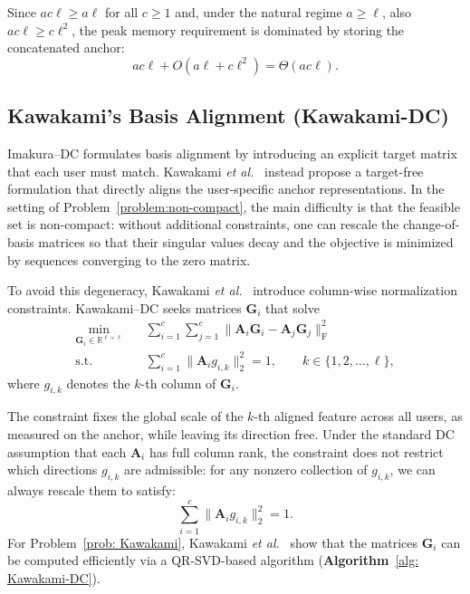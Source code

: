 \documentclass[final,3p,times]{elsarticle}
\theoremstyle{plain}
\newcommand{\matr}[1]{\bm{#1}}        %
\begin{document}
Since $a c \ell \ge a\ell$ for all $c \ge 1$ and, under the natural
regime $a \ge \ell$, also $a c \ell \ge c \ell^{2}$, the peak memory
requirement is dominated by storing the concatenated anchor:
\begin{equation}
  a c \ell + O(a\ell + c \ell^{2})
  = \Theta(a c \ell).
\end{equation}


\subsection{Kawakami's Basis Alignment (Kawakami-DC)}
\label{subsection: Kamakami}

Imakura--DC formulates basis alignment by introducing an explicit target matrix that each user must match. Kawakami \textit{et al.}~\cite{KawakamiDC} instead propose a target-free formulation that directly aligns the user-specific anchor representations. In the setting of Problem~\eqref{problem:non-compact}, the main difficulty is that the feasible set is non-compact: without additional constraints, one can rescale the change-of-basis matrices so that their singular values decay and the objective is minimized by sequences converging to the zero matrix.

To avoid this degeneracy, Kawakami \textit{et al.}~\cite{KawakamiDC} introduce column-wise normalization constraints. Kawakami--DC seeks matrices $\matr{G}_i$ that solve
\begin{equation}
    \label{prob: Kawakami}
    \begin{aligned}
        \min_{\matr{G}_{i}\in \mathbb{R}^{\ell \times \ell}}\quad
        & \sum_{i=1}^{c}\sum_{j=1}^{c}
        \bigl\|
            \matr{A}_{i}\matr{G}_{i}-\matr{A}_{j}\matr{G}_{j}
        \bigr\|_{\mathrm{F}}^{2} \\[4pt]
        \text{s.t.}\quad
        & \sum_{i=1}^{c}\bigl\|\matr{A}_{i} g_{i,k}\bigr\|_{2}^{2}=1,
        \qquad k\in\{1, 2, \ldots, \ell\},
    \end{aligned}
\end{equation}
where $g_{i,k}$ denotes the $k$-th column of $\matr{G}_i$.

The constraint fixes the global scale of the $k$-th aligned feature across all users, as measured on the anchor, while leaving its direction free. Under the standard DC assumption that each $\matr{A}_i$ has full column rank, the constraint does not restrict which directions $g_{i,k}$ are admissible: for any nonzero collection of $g_{i,k}$, we can always rescale them to satisfy:
\begin{equation}
    \sum_{i=1}^{c}\bigl\|\matr{A}_{i} g_{i,k}\bigr\|_{2}^{2}=1.
\end{equation}
For Problem~\eqref{prob: Kawakami}, Kawakami \textit{et al.}~\cite{KawakamiDC} show that the matrices $\matr{G}_i$ can be computed efficiently via a QR-SVD-based algorithm (\textbf{Algorithm}~\ref{alg: Kawakami-DC}).
\end{document}
